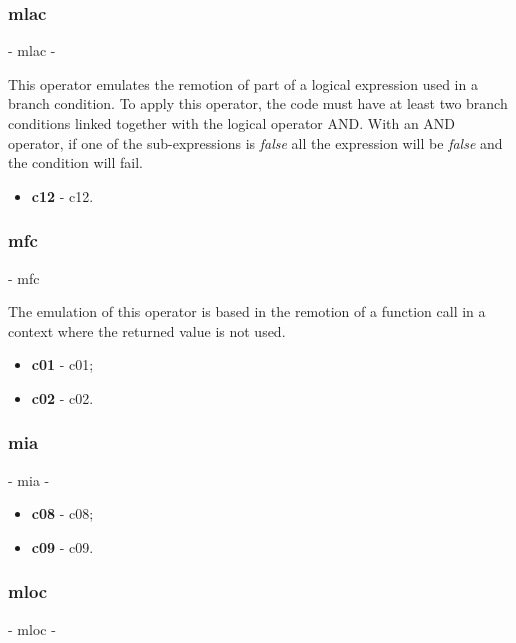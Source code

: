 	\hypertarget{mlac}{}
	\subsubsection{\textbf{\acs{mlac}}} - \Acl{mlac} - 

	This operator emulates the remotion of part of a logical expression used in a branch condition. To apply this operator, the code must have at least two branch conditions linked together with the logical operator AND. With an AND operator, if one of the sub-expressions is \textit{false} all the expression will be \textit{false} and the condition will fail.
	\begin{itemize}
		\item \textbf{\acs{c12}} - \Acl{c12}.
	\end{itemize}

	\hypertarget{mfc}{}
	\subsubsection{\textbf{\acs{mfc}}} - \Acl{mfc}

	The emulation of this operator is based in the remotion of a function call in a context where the returned value is not used.
	\begin{itemize}
		\item \textbf{\acs{c01}} - \Acl{c01};
		\item \textbf{\acs{c02}} - \Acl{c02}.
	\end{itemize}

	\hypertarget{mia}{}
	\subsubsection{\textbf{\acs{mia}}} - \Acl{mia} - 

	\begin{itemize}
		\item \textbf{\acs{c08}} - \Acl{c08};
		\item \textbf{\acs{c09}} - \Acl{c09}.
	\end{itemize}

	\hypertarget{mloc}{}
	\subsubsection{\textbf{\acs{mloc}}} - \Acl{mloc} - 

